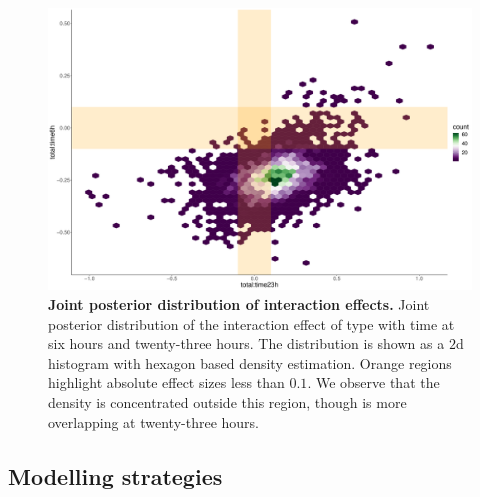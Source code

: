 \documentclass[12pt,english, journal=jpr, layout=twocolumn]{article}
\begin{document}
\begin{figure}[h!]
	\centering
	\includegraphics[width =1\textwidth]{figure4.pdf}
	\caption{\textbf{Joint posterior distribution of interaction effects.} Joint posterior distribution of the interaction effect of type with time at six hours and twenty-three hours. The distribution is shown as a $2$d histogram with hexagon based density estimation. Orange regions highlight absolute effect sizes less than $0.1$. We observe that the density is concentrated outside this region, though is more overlapping at twenty-three hours.}
	\label{figure::figure4}
\end{figure}


\subsection{Modelling strategies}
\end{document}
